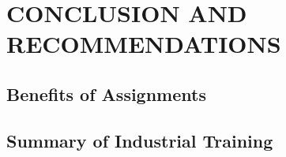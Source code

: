 \documentclass[l2pt]{report}
\begin{document}
\chapter{CONCLUSION AND RECOMMENDATIONS}       %

\section{Benefits of Assignments}       %

\section{Summary of Industrial Training}    %





\end{document}
